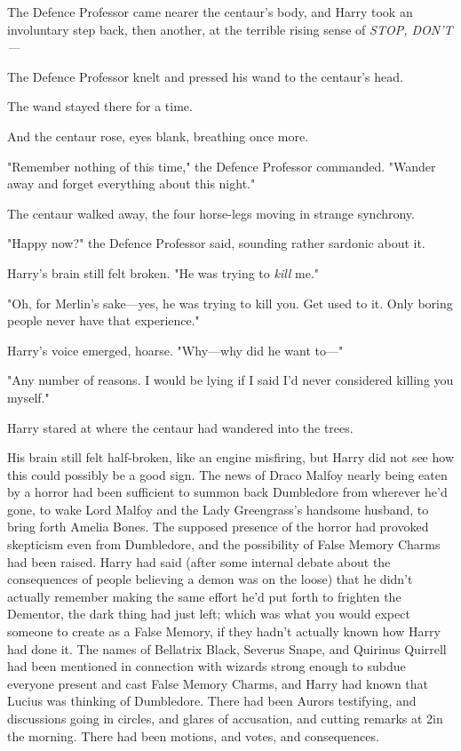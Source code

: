 The Defence Professor came nearer the centaur's body, and Harry took an
involuntary step back, then another, at the terrible rising sense of
\emph{STOP, DON'T---}

The Defence Professor knelt and pressed his wand to the centaur's head.

The wand stayed there for a time.

And the centaur rose, eyes blank, breathing once more.

"Remember nothing of this time," the Defence Professor commanded. "Wander away
and forget everything about this night."

The centaur walked away, the four horse-legs moving in strange synchrony.

"Happy now?" the Defence Professor said, sounding rather sardonic about it.

Harry's brain still felt broken. "He was trying to \emph{kill} me."

"Oh, for Merlin's sake---yes, he was trying to kill you. Get used to it. Only
boring people never have that experience."

Harry's voice emerged, hoarse. "Why---why did he want to---"

"Any number of reasons. I would be lying if I said I'd never considered killing
you myself."

Harry stared at where the centaur had wandered into the trees.

His brain still felt half-broken, like an engine misfiring, but Harry did not
see how this could possibly be a good sign.
\later
The news of Draco Malfoy nearly being eaten by a horror had been sufficient to
summon back Dumbledore from wherever he'd gone, to wake Lord Malfoy and the
Lady Greengrass's handsome husband, to bring forth Amelia Bones. The supposed
presence of the horror had provoked skepticism even from Dumbledore, and the
possibility of False Memory Charms had been raised. Harry had said (after some
internal debate about the consequences of people believing a demon was on the
loose) that he didn't actually remember making the same effort he'd put forth
to frighten the Dementor, the dark thing had just left; which was what you
would expect someone to create as a False Memory, if they hadn't actually known
how Harry had done it. The names of Bellatrix Black, Severus Snape, and
Quirinus Quirrell had been mentioned in connection with wizards strong enough
to subdue everyone present and cast False Memory Charms, and Harry had known
that Lucius was thinking of Dumbledore. There had been Aurors testifying, and
discussions going in circles, and glares of accusation, and cutting remarks at
2\AM in the morning. There had been motions, and votes, and consequences.

